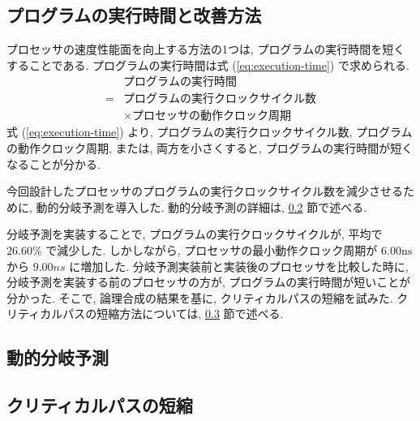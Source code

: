 \documentclass[../main.tex]{subfiles}
\begin{document}
  \subsection{プログラムの実行時間と改善方法}
  プロセッサの速度性能面を向上する方法の1つは, プログラムの実行時間を短くすることである.
  プログラムの実行時間は式 (\ref{eq:execution-time}) で求められる.
  \begin{equation}
    \begin{aligned}
      &プログラムの実行時間 \\
      = &プログラムの実行クロックサイクル数 \\
      &\times プロセッサの動作クロック周期
      \label{eq:execution-time}
    \end{aligned}
  \end{equation}
  式 (\ref{eq:execution-time}) より, プログラムの実行クロックサイクル数, プログラムの動作クロック周期, 
  または, 両方を小さくすると, プログラムの実行時間が短くなることが分かる.

  今回設計したプロセッサのプログラムの実行クロックサイクル数を減少させるために, 動的分岐予測を導入した.
  動的分岐予測の詳細は, \ref{subsection:jump-prediction} 節で述べる.

  分岐予測を実装することで, プログラムの実行クロックサイクルが, 平均で $26.60\%$ で減少した.
  しかしながら, プロセッサの最小動作クロック周期が $6.00\unit{\ns}$ から $9.00\unit{ns}$ に増加した.
  分岐予測実装前と実装後のプロセッサを比較した時に, 
  分岐予測を実装する前のプロセッサの方が, 
  プログラムの実行時間が短いことが分かった.
  そこで, 論理合成の結果を基に, クリティカルパスの短縮を試みた.
  クリティカルパスの短縮方法については, \ref{subsection:critical-path} 節で述べる.

  \subsection{動的分岐予測} \label{subsection:jump-prediction}
  

  \subsection{クリティカルパスの短縮} \label{subsection:critical-path}
  
\end{document}
